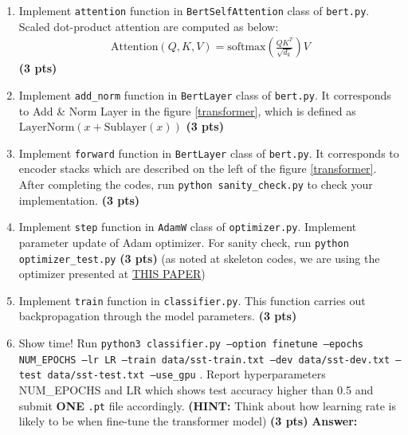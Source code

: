 \documentclass{assignment format}
\newenvironment{answer}{
    {\bf Answer:} \begingroup\color{red}
}{\endgroup}%
\begin{document}
\begin{enumerate}[label=(\alph*)]

    \item Implement \texttt{attention} function in \texttt{BertSelfAttention} class of \texttt{bert.py}. Scaled dot-product attention are computed as below: 
        \begin{align}
\text{Attention}(Q,K,V) = \text{softmax}(\frac{QK^T}{\sqrt{d_k}})V
\end{align} \textbf{(3 pts)}
    \item Implement \texttt{add\_norm} function in \texttt{BertLayer} class of \texttt{bert.py}. It corresponds to Add \& Norm Layer in the figure \ref{transformer}, which is defined as $\text{LayerNorm}(x+\text{Sublayer}(x))$ \textbf{(3 pts)}
    \item  Implement \texttt{forward} function in \texttt{BertLayer} class of \texttt{bert.py}. It corresponds to encoder stacks which are described on the left of the figure \ref{transformer}. After completing the codes, run \texttt{python sanity\_check.py} to check your implementation. \textbf{(3 pts)}
   \item  Implement \texttt{step} function in \texttt{AdamW} class of \texttt{optimizer.py}. Implement parameter update of Adam optimizer. For sanity check, run \texttt{python optimizer\_test.py} \textbf{(3 pts)}
       \newline (as noted at skeleton codes, we are using the optimizer presented at \href{https://arxiv.org/abs/1412.6980}{THIS PAPER}) 
  \item  Implement \texttt{train} function in \texttt{classifier.py}. This function carries out backpropagation through the model parameters. \textbf{(3 pts)}
  
   \item Show time! Run \texttt{python3 classifier.py --option finetune --epochs NUM\_EPOCHS --lr LR --train data/sst-train.txt --dev data/sst-dev.txt --test data/sst-test.txt --use\_gpu} . Report hyperparameters NUM\_EPOCHS and LR which shows test accuracy higher than 0.5 and submit \textbf{ONE} \texttt{.pt} file accordingly. \newline \textbf{(HINT: }Think about how learning rate is likely to be when fine-tune the transformer model) \textbf{(3 pts)} \begin{answer}
   \end{answer}
\end{enumerate}
\end{document}
